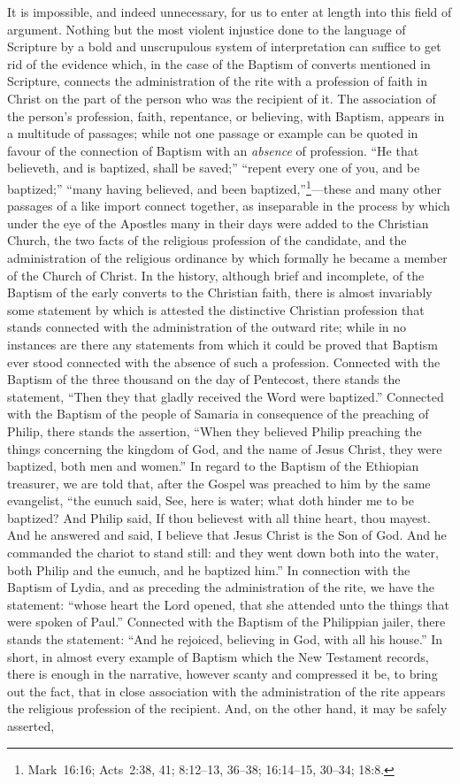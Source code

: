 \documentclass[
  english,
]{book}
\begin{document}
It is impossible, and indeed unnecessary, for us to enter at length into this field of argument. Nothing but the most violent injustice done to the language of Scripture by a bold and unscrupulous system of interpretation can suffice to get rid of the evidence which, in the case of the Baptism of converts mentioned in Scripture, connects the administration of the rite with a profession of faith in Christ on the part of the person who was the recipient of it. The association of the person's profession, faith, repentance, or believing, with Baptism, appears in a multitude of passages; while not one passage or example can be quoted in favour of the connection of Baptism with an \emph{absence} of profession. ``He that believeth, and is baptized, shall be saved;'' ``repent every one of you, and be baptized;'' ``many having believed, and been baptized,''\footnote{Mark~16:16; Acts~2:38, 41; 8:12--13, 36--38; 16:14--15, 30--34; 18:8.}---these and many other passages of a like import connect together, as inseparable in the process by which under the eye of the Apostles many in their days were added to the Christian Church, the two facts of the religious profession of the candidate, and the administration of the religious ordinance by which formally he became a member of the Church of Christ. In the history, although brief and incomplete, of the Baptism of the early converts to the Christian faith, there is almost invariably some statement by which is attested the distinctive Christian profession that stands connected with the administration of the outward rite; while in no instances are there any statements from which it could be proved that Baptism ever stood connected with the absence of such a profession. Connected with the Baptism of the three thousand on the day of Pentecost, there stands the statement, ``Then they that gladly received the Word were baptized.'' Connected with the Baptism of the people of Samaria in consequence of the preaching of Philip, there stands the assertion, ``When they believed Philip preaching the things concerning the kingdom of God, and the name of Jesus Christ, they were baptized, both men and women.'' In regard to the Baptism of the Ethiopian treasurer, we are told that, after the Gospel was preached to him by the same evangelist, ``the eunuch said, See, here is water; what doth hinder me to be baptized? And Philip said, If thou believest with all thine heart, thou mayest. And he answered and said, I believe that Jesus Christ is the Son of God. And he commanded the chariot to stand still: and they went down both into the water, both Philip and the eunuch, and he baptized him.'' In connection with the Baptism of Lydia, and as preceding the administration of the rite, we have the statement: ``whose heart the Lord opened, that she attended unto the things that were spoken of Paul.'' Connected with the Baptism of the Philippian jailer, there stands the statement: ``And he rejoiced, believing in God, with all his house.'' In short, in almost every example of Baptism which the New Testament records, there is enough in the narrative, however scanty and compressed it be, to bring out the fact, that in close association with the administration of the rite appears the religious profession of the recipient. And, on the other hand, it may be safely asserted, 
\end{document}
